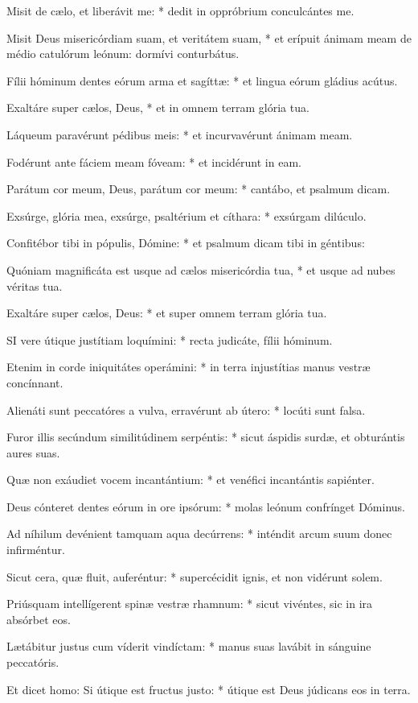 Misit de cælo, et liberávit me: * dedit in oppróbrium conculcántes me.

Misit Deus misericórdiam suam, et veritátem suam, * et erípuit ánimam meam de médio catulórum leónum: dormívi conturbátus.

Fílii hóminum dentes eórum arma et sagíttæ: * et lingua eórum gládius acútus.

Exaltáre super cælos, Deus, * et in omnem terram glória tua.

Láqueum paravérunt pédibus meis: * et incurvavérunt ánimam meam.

Fodérunt ante fáciem meam fóveam: * et incidérunt in eam.

Parátum cor meum, Deus, parátum cor meum: * cantábo, et psalmum dicam.

Exsúrge, glória mea, exsúrge, psaltérium et cíthara: * exsúrgam dilúculo.

Confitébor tibi in pópulis, Dómine: * et psalmum dicam tibi in géntibus:

Quóniam magnificáta est usque ad cælos misericórdia tua, * et usque ad nubes véritas tua.

Exaltáre super cælos, Deus: * et super omnem terram glória tua.


\lettrine[lines=2]{S}{I} vere útique justítiam loquímini: * recta judicáte, fílii hóminum.

Etenim in corde iniquitátes operámini: * in terra injustítias manus vestræ concínnant.

Alienáti sunt peccatóres a vulva, erravérunt ab útero: * locúti sunt falsa.

Furor illis secúndum similitúdinem serpéntis: * sicut áspidis surdæ, et obturántis aures suas.

Quæ non exáudiet vocem incantántium: * et venéfici incantántis sapiénter.

Deus cónteret dentes eórum in ore ipsórum: * molas leónum confrínget Dóminus.

Ad níhilum devénient tamquam aqua decúrrens: * inténdit arcum suum donec infirméntur.

Sicut cera, quæ fluit, auferéntur: * supercécidit ignis, et non vidérunt solem.

Priúsquam intellígerent spinæ vestræ rhamnum: * sicut vivéntes, sic in ira absórbet eos.

Lætábitur justus cum víderit vindíctam: * manus suas lavábit in sánguine peccatóris.

Et dicet homo: Si útique est fructus justo: * útique est Deus júdicans eos in terra.

